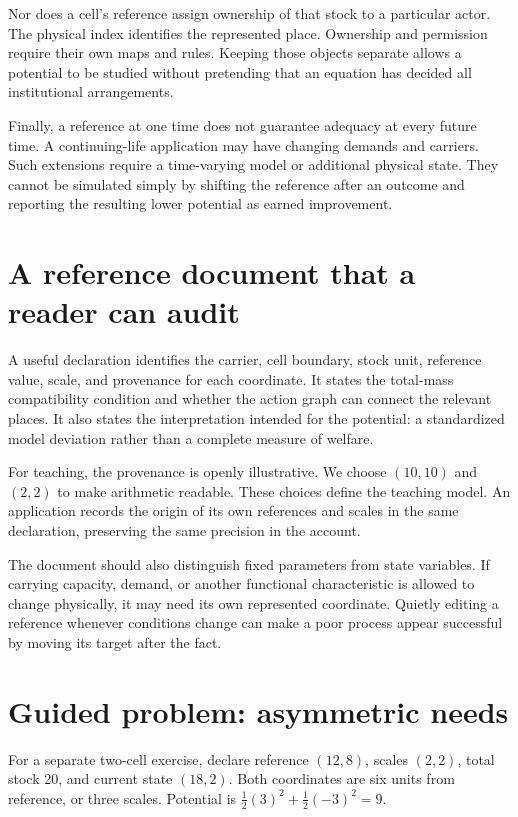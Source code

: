 Nor does a cell's reference assign ownership of that stock to a particular actor. The physical index identifies the represented place. Ownership and permission require their own maps and rules. Keeping those objects separate allows a potential to be studied without pretending that an equation has decided all institutional arrangements.

Finally, a reference at one time does not guarantee adequacy at every future time. A continuing-life application may have changing demands and carriers. Such extensions require a time-varying model or additional physical state. They cannot be simulated simply by shifting the reference after an outcome and reporting the resulting lower potential as earned improvement.

\section{A reference document that a reader can audit}
A useful declaration identifies the carrier, cell boundary, stock unit, reference value, scale, and provenance for each coordinate. It states the total-mass compatibility condition and whether the action graph can connect the relevant places. It also states the interpretation intended for the potential: a standardized model deviation rather than a complete measure of welfare.

For teaching, the provenance is openly illustrative. We choose \((10,10)\) and \((2,2)\) to make arithmetic readable. These choices define the teaching model. An application records the origin of its own references and scales in the same declaration, preserving the same precision in the account.

The document should also distinguish fixed parameters from state variables. If carrying capacity, demand, or another functional characteristic is allowed to change physically, it may need its own represented coordinate. Quietly editing a reference whenever conditions change can make a poor process appear successful by moving its target after the fact.

\section{Guided problem: asymmetric needs}
For a separate two-cell exercise, declare reference \((12,8)\), scales \((2,2)\), total stock 20, and current state \((18,2)\). Both coordinates are six units from reference, or three scales. Potential is \(\tfrac12(3)^2+\tfrac12(-3)^2=9\).

